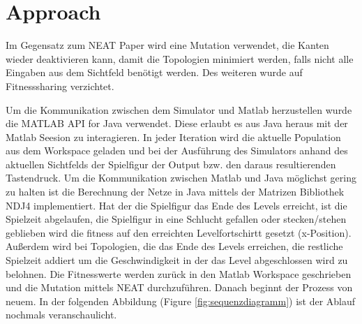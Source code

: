 \documentclass{hbrs-ecta-report}
\begin{document}
\FloatBarrier
\section{Approach}
Im Gegensatz zum NEAT Paper \cite{Stanley2002a} wird eine Mutation verwendet, die Kanten wieder deaktivieren kann, damit die Topologien minimiert werden, falls nicht alle Eingaben aus dem Sichtfeld benötigt werden. 
Des weiteren wurde auf Fitnesssharing verzichtet.


Um die Kommunikation zwischen dem Simulator und Matlab herzustellen wurde die MATLAB API for Java verwendet. Diese erlaubt es aus Java heraus mit der Matlab Seesion zu interagieren.
In jeder Iteration wird die aktuelle Population aus dem Workspace geladen und bei der Ausführung des Simulators anhand des aktuellen Sichtfelds der Spielfigur der Output bzw. den daraus resultierenden Tastendruck. 
Um die Kommunikation zwischen Matlab und Java möglichst gering zu halten ist die Berechnung der Netze in Java mittels der Matrizen Bibliothek NDJ4 %
implementiert. 
Hat der die Spielfigur das Ende des Levels erreicht, ist die Spielzeit abgelaufen, die Spielfigur in eine Schlucht gefallen oder stecken/stehen geblieben wird die fitness auf den erreichten Levelfortschirtt gesetzt (x-Position). Außerdem wird bei Topologien, die das Ende des Levels erreichen, die restliche Spielzeit addiert um die Geschwindigkeit in der das Level abgeschlossen wird zu belohnen. Die Fitnesswerte werden zurück in den Matlab Workspace geschrieben und die Mutation mittels NEAT durchzuführen. Danach beginnt der Prozess von neuem. 
In der folgenden Abbildung (Figure \ref{fig:sequenzdiagramm}) ist der Ablauf nochmals veranschaulicht.
\end{document}
